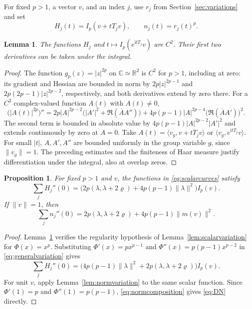 \documentclass[11pt,reqno]{amsart}
\numberwithin{equation}{section}
\theoremstyle{plain}
\newtheorem{proposition}[theorem]{Proposition}
\newtheorem{lemma}[theorem]{Lemma}
\theoremstyle{remark}
\newcommand{\C}{\mathbb C}
\newcommand{\R}{\mathbb R}
\newcommand{\rh}{\varrho}
\newcommand{\ii}{\mathrm i}
\newcommand{\norm}[1]{\lVert#1\rVert}
\newcommand{\ip}[2]{\langle#1,#2\rangle}
\begin{document}
For fixed $p>1$, a vector $v$, and an index $j$, use $r_j$ from
Section~\ref{sec:variations} and set
\begin{equation}\label{eq:scalarcurves}
 H_j(t)=I_p(v+tT_jv),\qquad n_j(t)=r_j(t)^p.
\end{equation}

\begin{lemma}\label{lem:powerregularity}
The functions $H_j$ and $t\mapsto I_p(e^{\ii tT_j}v)$ are $C^2$.
Their first two derivatives can be taken under the integral.
\end{lemma}
\begin{proof}
The function $g_p(z)=|z|^{2p}$ on $\C\simeq\R^2$ is $C^2$ for
$p>1$, including at zero: its gradient and Hessian are bounded in norm
by $2p|z|^{2p-1}$ and $2p(2p-1)|z|^{2p-2}$, respectively, and
both derivatives extend by zero there.
For a $C^2$ complex-valued function $A(t)$ with $A(t)\ne0$,
\[
 \bigl(|A(t)|^{2p}\bigr)''
 =2p|A|^{2p-2}\bigl(|A'|^2+\Re(\overline A A'')\bigr)
 +4p(p-1)|A|^{2p-4}
                  \bigl(\Re(\overline A A')\bigr)^2.
\]
The second term is bounded in absolute value by
$4p(p-1)|A|^{2p-2}|A'|^2$ and extends continuously by zero at $A=0$.
Take $A(t)=\ip{v_g}{v+tT_jv}$ or $\ip{v_g}{e^{\ii tT_j}v}$.
For small $|t|$, $A,A',A''$ are bounded uniformly in the
group variable $g$, since $\norm{v_g}=1$.  The preceding estimates
and the finiteness of Haar measure justify differentiation under
the integral, also at overlap zeros.
\end{proof}

\begin{proposition}\label{prop:powervariation}
For fixed $p>1$ and $v$, the functions in \eqref{eq:scalarcurves} satisfy
\begin{equation}\label{eq:DI}
 \sum_j H_j''(0)
   =\bigl(2p(\lambda,\lambda+2\rh)+4p(p-1)\norm{\lambda}^2\bigr)I_p(v).
\end{equation}
If $\norm v=1$, then
\begin{equation}\label{eq:DN}
 \sum_j n_j''(0)=2p(\lambda,\lambda+2\rh)+4p(p-1)\norm{m(v)}^2.
\end{equation}
\end{proposition}
\begin{proof}
Lemma~\ref{lem:powerregularity} verifies the regularity hypothesis of
Lemma~\ref{lem:scalarvariation} for $\Phi(x)=x^p$.
Substituting $\Phi'(x)=px^{p-1}$ and
$\Phi''(x)=p(p-1)x^{p-2}$ in \eqref{eq:generalvariation} gives
\[
 \sum_jH_j''(0)
 =\bigl(4p(p-1)\norm{\lambda}^2+2p(\lambda,\lambda+2\rh)\bigr)I_p(v).
\]
For unit $v$, apply Lemma~\ref{lem:normvariation} to the same scalar
function. Since $\Phi'(1)=p$ and $\Phi''(1)=p(p-1)$,
\eqref{eq:normcomposition} gives \eqref{eq:DN} directly.
\end{proof}
\end{document}
